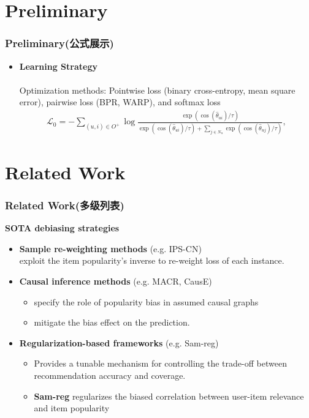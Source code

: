 \documentclass[aspectratio=169]{beamer}%
\begin{document}
{%
\section{Preliminary}  
\begin{frame}
    \frametitle{Preliminary(公式展示)}
    \begin{itemize}
        \item{\textbf{Learning Strategy}}
        \\ \hspace*{\fill} \\
        Optimization methods:
        Pointwise loss (binary cross-entropy, mean square error), pairwise loss (BPR, WARP), and {\color{red}softmax loss}
        \begin{gather}
            \mathcal{L}_0 = -\sum_{(u,i)\in{O}^{+}}\log\frac{\exp{(\cos(\hat{\theta}_{ui})/\tau)}}{\exp{(\cos(\hat{\theta}_{ui})/\tau)}+\sum_{j\in{N}_{u}}\exp{(\cos(\hat{\theta}_{uj})/\tau)}},
            \nonumber
        \end{gather}
    \end{itemize}
\end{frame}

\section{Related Work}  
    \begin{frame}
        \frametitle{Related Work(多级列表)}
        \textbf{SOTA debiasing strategies}
        \begin{itemize}
        \item
        \textbf{Sample re-weighting methods} (e.g. IPS-CN)\\
        exploit the item popularity's inverse to re-weight loss of each instance.
        \item
        \textbf{Causal inference methods} (e.g. MACR, CausE)\\
        \begin{itemize}
        \item
        specify the role of popularity bias in assumed causal
        graphs 
        \item
        mitigate the bias effect on the prediction.
        \end{itemize}
        \item
        {
        \textbf{Regularization-based frameworks} (e.g. Sam-reg) \\
        \begin{itemize}
            \item Provides a tunable mechanism for controlling the trade-off between recommendation accuracy and coverage.\\
            \item
                 \textbf{Sam-reg} regularizes the biased correlation between user-item relevance and item popularity
        \end{itemize}}
        \end{itemize}
    \end{frame}

}
\end{document}
